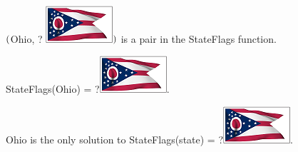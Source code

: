 \documentclass{ximera}
\begin{document}
\quad \\



\begin{example}

$\Large{(}$Ohio, ? \includegraphics{pics/StateFlags/Ohio.png}$\Large{)}$ is a pair in the StateFlags function.

StateFlags(Ohio) = ?\includegraphics{pics/StateFlags/Ohio.png}.

Ohio is the only solution to StateFlags(state) = ?\includegraphics{pics/StateFlags/Ohio.png}.

\end{example}
\end{document}
